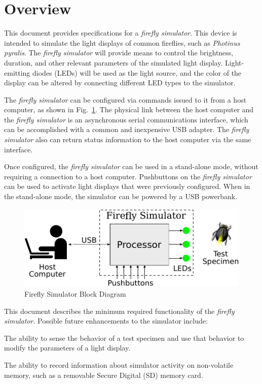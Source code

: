 \documentclass[letterpaper,11pt]{article}
\begin{document}
\section{Overview}

This document provides specifications for a \textit{firefly simulator}. This
device is intended to simulate the light displays of common fireflies, such
as \textit{Photinus pyralis}. The \textit{firefly simulator} will provide means
to control the brightness, duration, and other relevant parameters of the
simulated light display. Light-emitting diodes (LEDs) will be used as the light
source, and the color of the display can be altered by connecting different
LED types to the simulator.

The \textit{firefly simulator} can be configured via commands issued to it
from a host computer, as shown in Fig.\ \ref{fig:BlockDiagram}. The physical
link between the host computer and the \textit{firefly simulator} is an
asynchronous serial communications interface, which can be accomplished with a
common and inexpensive USB adapter. The \textit{firefly simulator} also can
return status information to the host computer via the same interface.

Once configured, the \textit{firefly simulator} can be used in a stand-alone
mode, without requiring a connection to a host computer. Pushbuttons on the
\textit{firefly simulator} can be used to activate light displays that were
previously configured. When in the stand-alone mode, the simulator can be
powered by a USB powerbank.

\begin{figure}[h]
  \begin{center}
    \includegraphics[scale=1.5]{Flashes_BlockDiagram}
  \end{center}
  \vspace{-18pt}
  \caption{Firefly Simulator Block Diagram}
  \label{fig:BlockDiagram}
\end{figure}

This document describes the minimum required functionality of the
\textit{firefly simulator}. Possible future enhancements to the simulator
include:
\begin{compactitem}
  \item The ability to sense the behavior of a test specimen and use that
    behavior to modify the parameters of a light display.
  \item The ability to record information about simulator activity on
    non-volatile memory, such as a removable Secure Digital (SD) memory card.
\end{compactitem}
\end{document}
